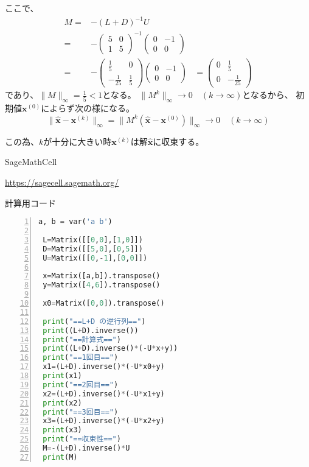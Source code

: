 \documentclass[12pt,b5paper]{ltjsarticle}
\begin{document}
\begin{enumerate}
       ここで、
       \begin{align}
        M=&-(L+D)^{-1}U\\
             =& - \begin{pmatrix} 5 & 0 \\ 1 & 5 \end{pmatrix}^{-1}
        \begin{pmatrix}0&-1\\0&0\end{pmatrix}\\
             =& - \begin{pmatrix} \frac{1}{5} & 0 \\ -\frac{1}{25} & \frac{1}{5} \end{pmatrix}
        \begin{pmatrix}0&-1\\0&0\end{pmatrix}
           &= \begin{pmatrix}0&\frac{1}{5}\\0&-\frac{1}{25}\end{pmatrix}
       \end{align}
       であり、$\| M \|_{\infty}=\frac{1}{5}<1$となる。
       $\|M^k\|_{\infty} \rightarrow 0 \quad (k\rightarrow\infty)$となるから、
       初期値$\bm{x}^{(0)}$によらず次の様になる。
       \begin{equation}
        \|\hat{\bm{x}}-\bm{x}^{(k)}\|_{\infty}
         =\|M^k(\hat{\bm{x}}-\bm{x}^{(0)})\|_{\infty}
         \rightarrow 0 \quad (k\rightarrow\infty)
       \end{equation}

       この為、$k$が十分に大きい時$\bm{x}^{(k)}$は解$\hat{\bm{x}}$に収束する。



\end{enumerate}



\hrulefill

SageMathCell

\url{https://sagecell.sagemath.org/}

計算用コード
\begin{lstlisting}[language=Python,basicstyle={\small},frame=single,numbers=left]
 a, b = var('a b')

 L=Matrix([[0,0],[1,0]])
 D=Matrix([[5,0],[0,5]])
 U=Matrix([[0,-1],[0,0]])

 x=Matrix([a,b]).transpose()
 y=Matrix([4,6]).transpose()

 x0=Matrix([0,0]).transpose()

 print("==L+D の逆行列==")
 print((L+D).inverse())
 print("==計算式==")
 print((L+D).inverse()*(-U*x+y))
 print("==1回目==")
 x1=(L+D).inverse()*(-U*x0+y)
 print(x1)
 print("==2回目==")
 x2=(L+D).inverse()*(-U*x1+y)
 print(x2)
 print("==3回目==")
 x3=(L+D).inverse()*(-U*x2+y)
 print(x3)
 print("==収束性==")
 M=-(L+D).inverse()*U
 print(M)
\end{lstlisting}
\end{document}

